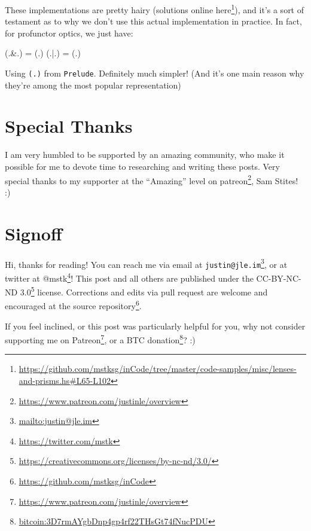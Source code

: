 \documentclass[]{article}
\newenvironment{Shaded}{}{}
\newcommand{\FunctionTok}[1]{\textcolor[rgb]{0.02,0.16,0.49}{#1}}
\newcommand{\NormalTok}[1]{#1}
\renewcommand{\href}[2]{#2\footnote{\url{#1}}}
\begin{document}
\begin{itemize}
  These implementations are pretty hairy (solutions
  \href{https://github.com/mstksg/inCode/tree/master/code-samples/misc/lenses-and-prisms.hs\#L65-L102}{online
  here}), and it's a sort of testament as to why we don't use this actual
  implementation in practice. In fact, for profunctor optics, we just have:

\begin{Shaded}
\begin{Highlighting}[]
\NormalTok{(}\FunctionTok{.&.}\NormalTok{) }\FunctionTok{=}\NormalTok{ (}\FunctionTok{.}\NormalTok{)}
\NormalTok{(}\FunctionTok{.|.}\NormalTok{) }\FunctionTok{=}\NormalTok{ (}\FunctionTok{.}\NormalTok{)}
\end{Highlighting}
\end{Shaded}

  Using \texttt{(.)} from \texttt{Prelude}. Definitely much simpler! (And it's
  one main reason why they're among the most popular representation)
\end{itemize}

\hypertarget{special-thanks}{%
\section{Special Thanks}\label{special-thanks}}

I am very humbled to be supported by an amazing community, who make it possible
for me to devote time to researching and writing these posts. Very special
thanks to my supporter at the ``Amazing'' level on
\href{https://www.patreon.com/justinle/overview}{patreon}, Sam Stites! :)

\hypertarget{signoff}{%
\section{Signoff}\label{signoff}}

Hi, thanks for reading! You can reach me via email at
\href{mailto:justin@jle.im}{\nolinkurl{justin@jle.im}}, or at twitter at
\href{https://twitter.com/mstk}{@mstk}! This post and all others are published
under the \href{https://creativecommons.org/licenses/by-nc-nd/3.0/}{CC-BY-NC-ND
3.0} license. Corrections and edits via pull request are welcome and encouraged
at \href{https://github.com/mstksg/inCode}{the source repository}.

If you feel inclined, or this post was particularly helpful for you, why not
consider \href{https://www.patreon.com/justinle/overview}{supporting me on
Patreon}, or a \href{bitcoin:3D7rmAYgbDnp4gp4rf22THsGt74fNucPDU}{BTC donation}?
:)
\end{document}
